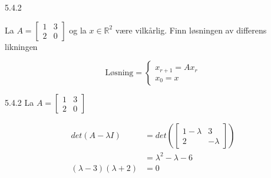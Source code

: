 \documentclass[a4paper,norsk]{article}
\begin{document}
\begin{oppgavebox}{5.4.2}{}

La $ A = \begin{bmatrix}
    1&3\\
    2&0
\end{bmatrix}  $ og la $ x \in \mathbb{R}^2 $ være vilkårlig. Finn løsningen av differens likningen

\[
    \text{Løsning} = \begin{cases}
        x_{r+1} = Ax_r\\
        x_0 = x
    \end{cases}
\]

\begin{proofbox}{5.4.2}{}
La $ A = \begin{bmatrix}
    1&3\\
    2&0
\end{bmatrix}  $ 

\begin{align*}
    det(A-\lambda I) &= det \left(  \begin{bmatrix}
        1-\lambda& 3 \\
        2 &-\lambda
    \end{bmatrix}  \right) \\
    &= \lambda^2 - \lambda - 6 \\
    \left( \lambda -3 \right) \left( \lambda +2 \right) &=0
\end{align*}


\end{proofbox}
\end{oppgavebox}
\end{document}
